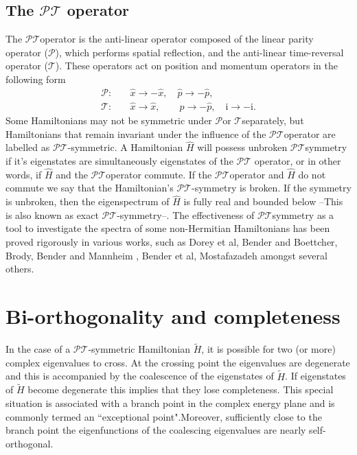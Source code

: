 \documentclass[12pt, a4paper]{report}
\newcommand\PT{\(\mathcal{PT}\)}
\newcommand\PP{\(\mathcal{P}\)}
\newcommand\TT{\(\mathcal{T}\)}
\begin{document}
\subsection{The \texorpdfstring{$\mathcal{PT}$}\: operator}
The \PT\:operator is the anti-linear operator composed of the linear parity operator (\PP), which performs spatial reflection, and the anti-linear time-reversal operator (\TT). These operators act on position and momentum operators in the following form
\begin{equation}\label{eq:2}
\begin{split}
\mathcal{P}:& \quad\hat{x} \rightarrow -\hat{x},\quad \hat{p} \rightarrow -\hat{p},\\
\mathcal{T}:& \quad\hat{x} \rightarrow \hat{x},\quad\quad \hat{p} \rightarrow -\hat{p},\quad \mathrm{i} \rightarrow -\mathrm{i}.
\end{split}
\end{equation}
Some Hamiltonians may not be symmetric under \PP\:or \TT\:separately, but Hamiltonians that remain invariant under the influence of the \PT\:operator are labelled as \PT-symmetric. A Hamiltonian $\hat{H}$ will possess unbroken \PT\:symmetry if it's eigenstates are simultaneously eigenstates of the \PT\: operator, or in other words, if $\hat{H}$ and the \PT\:operator commute. If the \PT\:operator and $\hat{H}$ do not commute we say that the Hamiltonian's \PT-symmetry is broken\cite{MakingSense}\cite{ComplexExtension}\cite{MustaHbeHermitian}. If the symmetry is unbroken, then the eigenspectrum of $\hat{H}$ is fully real and bounded below --This is also known as exact \PT-symmetry--. The effectiveness of \PT\:symmetry as a tool to investigate the spectra of some non-Hermitian Hamiltonians has been proved rigorously in various works, such as Dorey et al\cite{Dorey_2001}, Bender and Boettcher\cite{Bender1998}, Brody\cite{Brody_2016}, Bender and Mannheim \cite{Bender_2010}, Bender et al\cite{PT-symmetricQM}, Mostafazadeh\cite{Mostafazadeh}\cite{Mostafazadeh2} amongst several others. 


\section{Bi-orthogonality and completeness}\label{Biorth}
In the case of a \PT-symmetric Hamiltonian $\tilde{H}$, it is possible for two (or more) complex eigenvalues to cross. At the crossing point the eigenvalues are degenerate and this is accompanied by the coalescence of the eigenstates of $\tilde{H}$. If eigenstates of $\tilde{H}$ become degenerate this implies that they lose completeness\cite{Brody_2013}. This special situation is associated with a branch point in the complex energy plane and is commonly termed an ``exceptional point"\cite{Moiseyev}.Moreover, sufficiently close to the branch point the eigenfunctions of the coalescing eigenvalues are nearly self-orthogonal.
\end{document}
